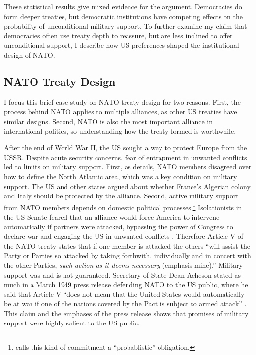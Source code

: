 \documentclass[12pt]{article}
\begin{document}
These statistical results give mixed evidence for the argument. 
Democracies do form deeper treaties, but democratic institutions have competing effects on the probability of unconditional military support. 
To further examine my claim that democracies often use treaty depth to reassure, but are less inclined to offer unconditional support, I describe how US preferences shaped the institutional design of NATO. 


\subsection{NATO Treaty Design}


I focus this brief case study on NATO treaty design for two reasons. 
First, the process behind NATO applies to multiple alliances, as other US treaties have similar designs. 
Second, NATO is also the most important alliance in international politics, so understanding how the treaty formed is worthwhile. 


After the end of World War II, the US sought a way to protect Europe from the USSR. 
Despite acute security concerns, fear of entrapment in unwanted conflicts led to limits on military support. 
First, as \citet{Poast2019a} details, NATO members disagreed over how to define the North Atlantic area, which was a key condition on military support. 
The US and other states argued about whether France's Algerian colony and Italy should be protected by the alliance. 
Second, active military support from NATO members depends on domestic political processes.\footnote{\citet{Benson2012} calls this kind of commitment a ``probablistic'' obligation.} 
Isolationists in the US Senate feared that an alliance would force America to intervene automatically if partners were attacked, bypassing the power of Congress to declare war and engaging the US in unwanted conflicts \citep[pg. 280-1]{Acheson1969}.
Therefore Article V of the NATO treaty states that if one member is attacked the others ``will assist the Party or Parties so attacked by taking forthwith, individually and in concert with the other Parties, \emph{such action as it deems necessary} (emphasis mine).'' 
Military support was and is not guaranteed. 
Secretary of State Dean Acheson stated as much in a March 1949 press release defending NATO to the US public, where he said that Article V ``does not mean that the United States would automatically be at war if one of the nations covered by the Pact is subject to armed attack'' \citep{Acheson1949}.
This claim and the emphases of the press release shows that promises of military support were highly salient to the US public.
\end{document}
